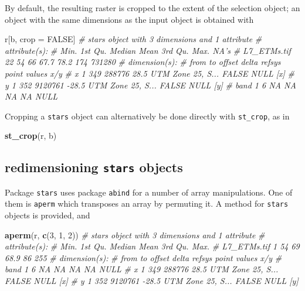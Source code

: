 \documentclass[]{book}
\newenvironment{Shaded}{\begin{snugshade}}{\end{snugshade}}
\newcommand{\CommentTok}[1]{\textcolor[rgb]{0.56,0.35,0.01}{\textit{#1}}}
\newcommand{\DecValTok}[1]{\textcolor[rgb]{0.00,0.00,0.81}{#1}}
\newcommand{\KeywordTok}[1]{\textcolor[rgb]{0.13,0.29,0.53}{\textbf{#1}}}
\newcommand{\NormalTok}[1]{#1}
\newcommand{\OtherTok}[1]{\textcolor[rgb]{0.56,0.35,0.01}{#1}}
\newcommand{\StringTok}[1]{\textcolor[rgb]{0.31,0.60,0.02}{#1}}
\begin{document}
By default, the resulting raster is cropped to the extent of the
selection object; an object with the same dimensions as the input
object is obtained with

\begin{Shaded}
\begin{Highlighting}[]
\NormalTok{r[b, crop =}\StringTok{ }\OtherTok{FALSE}\NormalTok{]}
\CommentTok{# stars object with 3 dimensions and 1 attribute}
\CommentTok{# attribute(s):}
\CommentTok{#              Min. 1st Qu. Median Mean 3rd Qu. Max.   NA's}
\CommentTok{# L7_ETMs.tif    22      54     66 67.7    78.2  174 731280}
\CommentTok{# dimension(s):}
\CommentTok{#      from  to  offset delta            refsys point values x/y}
\CommentTok{# x       1 349  288776  28.5 UTM Zone 25, S... FALSE   NULL [x]}
\CommentTok{# y       1 352 9120761 -28.5 UTM Zone 25, S... FALSE   NULL [y]}
\CommentTok{# band    1   6      NA    NA                NA    NA   NULL}
\end{Highlighting}
\end{Shaded}

Cropping a \texttt{stars} object can alternatively be done directly with \texttt{st\_crop}, as in

\begin{Shaded}
\begin{Highlighting}[]
\KeywordTok{st_crop}\NormalTok{(r, b)}
\end{Highlighting}
\end{Shaded}

\hypertarget{redimensioning-stars-objects}{%
\subsection{\texorpdfstring{redimensioning \texttt{stars} objects}{redimensioning stars objects}}\label{redimensioning-stars-objects}}

Package \texttt{stars} uses package \texttt{abind} \citep{R-abind} for a number of
array manipulations. One of them is \texttt{aperm} which transposes an
array by permuting it. A method for \texttt{stars} objects is provided, and

\begin{Shaded}
\begin{Highlighting}[]
\KeywordTok{aperm}\NormalTok{(r, }\KeywordTok{c}\NormalTok{(}\DecValTok{3}\NormalTok{, }\DecValTok{1}\NormalTok{, }\DecValTok{2}\NormalTok{))}
\CommentTok{# stars object with 3 dimensions and 1 attribute}
\CommentTok{# attribute(s):}
\CommentTok{#              Min. 1st Qu. Median Mean 3rd Qu. Max.}
\CommentTok{# L7_ETMs.tif     1      54     69 68.9      86  255}
\CommentTok{# dimension(s):}
\CommentTok{#      from  to  offset delta            refsys point values x/y}
\CommentTok{# band    1   6      NA    NA                NA    NA   NULL    }
\CommentTok{# x       1 349  288776  28.5 UTM Zone 25, S... FALSE   NULL [x]}
\CommentTok{# y       1 352 9120761 -28.5 UTM Zone 25, S... FALSE   NULL [y]}
\end{Highlighting}
\end{Shaded}
\end{document}
